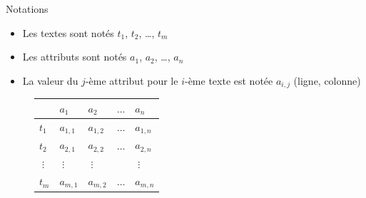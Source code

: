 \documentclass[hyperref={unicode}, xcolor={svgnames}, french]{beamer}
\begin{document}
\begin{frame}[fragile=singleslide]{Notations}
    \begin{itemize}
        \item Les textes sont notés $t_1$, $t_2$, …, $t_m$
        \item Les attributs sont notés $a_1$, $a_2$, …, $a_n$
        \item La valeur du $j$-ème attribut pour le $i$-ème texte est notée $a_{i,j}$ (ligne, colonne)
    \end{itemize}

    \begin{figure}
        \begin{tabu} to 0.9
                    & $a_1$     & $a_2$     & $…$ & $a_n$\\
            \hline
            $t_1$   & $a_{1,1}$ & $a_{1,2}$ & $…$ & $a_{1,n}$\\
            $t_2$   & $a_{2,1}$ & $a_{2,2}$ & $…$ & $a_{2,n}$\\
            $⋮$    & $⋮$      & $⋮$       &     & $⋮$\\
            $t_m$   & $a_{m,1}$ & $a_{m,2}$ & $…$ & $a_{m,n}$\\
         \end{tabu}
    \end{figure}
\end{frame}

\end{document}
